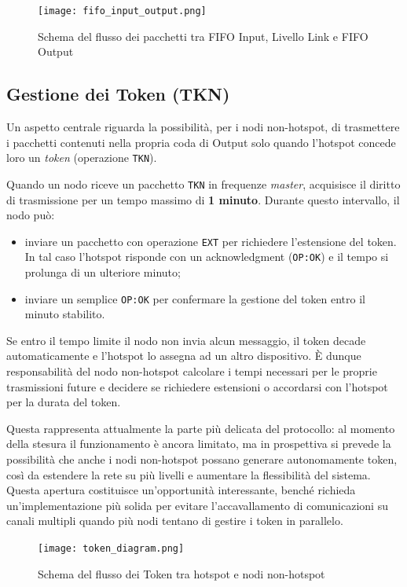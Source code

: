\begin{figure}[H]
    \centering
    \texttt{[image: fifo\_input\_output.png]}
    \caption{Schema del flusso dei pacchetti tra FIFO Input, Livello Link e FIFO Output}
    \label{fig:fifo_input_output}
\end{figure}

\subsection{Gestione dei Token (TKN)}

Un aspetto centrale riguarda la possibilità, per i nodi non-hotspot, di trasmettere i pacchetti contenuti nella propria coda di Output solo quando l’hotspot concede loro un \emph{token} (operazione \texttt{TKN}).  

Quando un nodo riceve un pacchetto \texttt{TKN} in frequenze \emph{master}, acquisisce il diritto di trasmissione per un tempo massimo di \textbf{1 minuto}.  
Durante questo intervallo, il nodo può: 
\begin{itemize}
  \item inviare un pacchetto con operazione \texttt{EXT} per richiedere l’estensione del token. In tal caso l’hotspot risponde con un acknowledgment (\texttt{OP:OK}) e il tempo si prolunga di un ulteriore minuto;
  \item inviare un semplice \texttt{OP:OK} per confermare la gestione del token entro il minuto stabilito.
\end{itemize}

Se entro il tempo limite il nodo non invia alcun messaggio, il token decade automaticamente e l’hotspot lo assegna ad un altro dispositivo.  
È dunque responsabilità del nodo non-hotspot calcolare i tempi necessari per le proprie trasmissioni future e decidere se richiedere estensioni o accordarsi con l’hotspot per la durata del token.  

Questa rappresenta attualmente la parte più delicata del protocollo: al momento della stesura il funzionamento è ancora limitato, ma in prospettiva si prevede la possibilità che anche i nodi non-hotspot possano generare autonomamente token, così da estendere la rete su più livelli e aumentare la flessibilità del sistema.  
Questa apertura costituisce un’opportunità interessante, benché richieda un’implementazione più solida per evitare l’accavallamento di comunicazioni su canali multipli quando più nodi tentano di gestire i token in parallelo.  
\begin{figure}[H]
    \centering
    \texttt{[image: token\_diagram.png]}
    \caption{Schema del flusso dei Token tra hotspot e nodi non-hotspot}
    \label{fig:token_diagram}
\end{figure}

